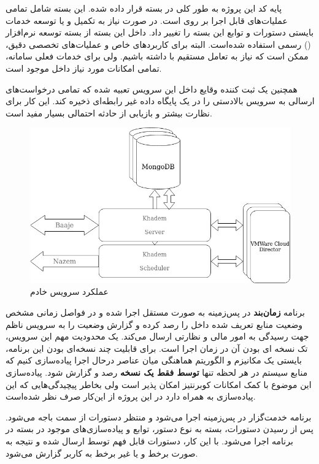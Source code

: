 پایه کد این پروژه به طور کلی در بسته  قرار داده شده. این بسته شامل تمامی عملیات‌های قابل اجرا بر روی  است. در صورت نیاز به تکمیل و یا توسعه خدمات بایستی دستورات و توابع این بسته را تغییر داد. داخل این بسته از بسته توسعه نرم‌افزار () رسمی  استفاده شده‌است. البته برای کاربرد‌های خاص و عملیات‌های تخصصی دقیق، ممکن است که نیاز به تعامل مستقیم با  داشته باشیم. ولی برای خدمات فعلی سامانه، تمامی امکانات مورد نیاز داخل  موجود است.

همچنین یک ثبت کننده وقایع داخل این سرویس تعبیه شده که تمامی درخواست‌های ارسالی به سرویس‌ بالا‌دستی را در یک پایگاه داده غیر رابطه‌ای ذخیره کند. این کار برای نظارت بیشتر و بازیابی از حادثه احتمالی بسیار مفید است.

\begin{figure}
	\centering
	\includegraphics[scale=0.5]{figures/30bird-khadem.jpeg}
	\caption{عملکرد سرویس خادم}
	\label{fig:30bird-khadem}
\end{figure}

برنامه \textbf{زمان‌بند} در پس‌زمینه به صورت مستقل اجرا شده و در فواصل زمانی مشخص وضعیت منابع تعریف شده داخل  را رصد کرده و گزارش وضعیت را به سرویس ناظم جهت رسیدگی به امور مالی و نظارتی ارسال می‌کند. یک محدودیت مهم این سرویس، تک نسخه ای بودن آن در زمان اجرا است. برای قابلیت چند نسخه‌ای بودن این برنامه، بایستی یک مکانیزم و الگوریتم هماهنگی میان عناصر درحال اجرا پیاده‌سازی کنیم که منابع سیستم در هر لحظه تنها \textbf{توسط فقط یک نسخه} رصد و گزارش شود. پیاده‌سازی این موضوع با کمک امکانات کوبرنتیز امکان پذیر است ولی بخاطر پیچیدگی‌هایی که این پیاده‌سازی به همراه دارد در این پروژه از این‌کار صرف نظر شده‌است.

برنامه خدمت‌گزار در پس‌زمینه اجرا می‌شود و منتظر دستورات از سمت باجه می‌شود. پس از رسیدن دستورات، بسته به نوع دستور، توابع و پیاده‌سازی‌های موجود در بسته  در برنامه اجرا می‌شود. با این کار، دستورات قابل فهم توسط  ارسال شده و نتیجه به صورت برخط و یا غیر برخط به کاربر گزارش می‌شود.


